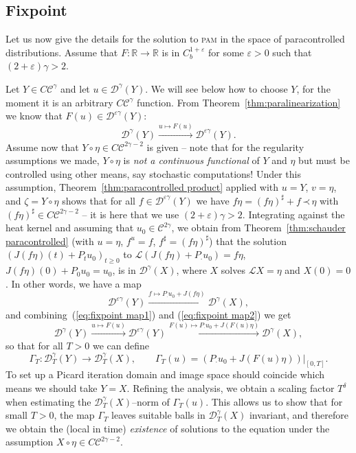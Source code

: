 \documentclass[a4paper,11pt]{article}
\newcommand{\cdummy}{\cdot}
\newcommand{\tmname}[1]{\textsc{#1}}
\newcommand{\tmtextit}[1]{{\itshape{#1}}}
\newcommand{\LL}{\mathscr{L}}
\newcommand{\CC}{\mathscr{C}}
\newcommand{\CD}{\mathscr{D}}
\newcommand{\lpara}{\,\mathord{\prec}\,}
\newcommand{\reso}{\,\mathord{\circ}\,}
\begin{document}
\subsection{Fixpoint}\label{sec:fixpoint}

Let us now give the details for the solution to {\tmname{pam}} in the space of
paracontrolled distributions. Assume that $F : \mathbb{R} \rightarrow
\mathbb{R}$ is in $C^{1 + \varepsilon}_b$ for some $\varepsilon > 0$ such
that $(2 + \varepsilon) \gamma > 2$.

Let $Y \in C\CC^{\gamma}$ and let $u \in \CD^{\gamma} (Y)$. We will see below how to choose $Y$, for the moment it is an arbitrary $C \CC^\gamma$ function. From Theorem~\ref{thm:paralinearization} we know that $F (u) \in \CD^{\varepsilon\gamma} (Y)$:
\begin{equation}
  \label{eq:fixpoint map1} \CD^{\gamma} (Y) \xrightarrow{u \mapsto F (u)}
  \CD^{\varepsilon \gamma} (Y) .
\end{equation}
Assume now that $Y \reso \eta \in C \CC^{2 \gamma - 2}$ is given -- note that for the regularity assumptions we made, $Y \reso \eta$ is \emph{not a continuous functional} of $Y$ and $\eta$ but must be controlled using other means, say stochastic computations! Under this assumption, 
Theorem~\ref{thm:paracontrolled product} applied with $u = Y$, $v = \eta$, and $\zeta = Y \circ \eta$ shows that for all $f \in \CD^{\varepsilon \gamma}(Y)$ we have $f \eta = (f \eta)^{\sharp} + f \lpara
\eta$ with $(f \eta)^{\sharp} \in C \CC^{2 \gamma - 2}$ -- it is here that
we use $(2 + \varepsilon) \gamma > 2$. Integrating against the heat kernel and
assuming that $u_0 \in \CC^{2 \gamma}$, we obtain from
Theorem~\ref{thm:schauder paracontrolled} (with $u = \eta$, $f^u = f$, $f^\sharp = (f \eta)^\sharp$) that the solution $(J (f \eta) (t) + P_t u_0)_{t \geqslant 0}$ to $\LL (J (f \eta) + P_{\cdummy} u_0) = f \eta$, $J
(f \eta) (0) + P_0 u_0 = u_0$, is in $\CD^{\gamma} (X)$, where $X$ solves $\LL
X = \eta$ and $X (0) = 0$. In other words, we have a map
\begin{equation}
  \label{eq:fixpoint map2} \CD^{\varepsilon \gamma} (Y) \xrightarrow{f \mapsto
  P_\cdot u_0 + J (f \eta)} \CD^{\gamma} (X),
\end{equation}
and combining~(\ref{eq:fixpoint map1}) and (\ref{eq:fixpoint map2}) we get
\[ \CD^{\gamma} (Y) \xrightarrow{u \mapsto F (u)} \CD^{\varepsilon \gamma} (Y)
   \xrightarrow{F (u) \mapsto P_\cdot u_0 + J (F (u) \eta)} \CD^{\gamma} (X), \]
so that for all $T > 0$ we can define
\[ \Gamma_T : \CD_T^{\gamma} (Y) \rightarrow \CD_T^{\gamma} (X),
   \hspace{2em} \Gamma_T (u) = (P_\cdot u_0 + J (F (u) \eta)) |_{[0, T]} . \]
To set up a Picard iteration domain and image space should coincide which
means we should take $Y = X$. Refining the analysis, we obtain a scaling
factor $T^{\delta}$ \label{page:scaling factor} when estimating the $\CD_T^{\gamma} (X)$--norm of
$\Gamma_T (u)$. This allows us to show that for small $T > 0$, the map
$\Gamma_T$ leaves suitable balls in $\CD^{\gamma}_T (X)$ invariant, and
therefore we obtain the (local in time) \tmtextit{existence} of solutions to
the equation under the assumption $X \reso \eta \in C \CC^{2 \gamma - 2}$.
\end{document}
